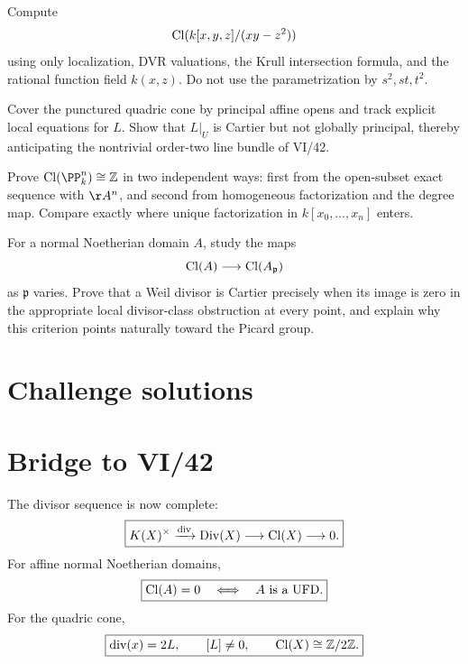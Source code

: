 \begin{problem}\label{chal:vi41-02}
Compute
\[
 \operatorname{Cl}(k[x,y,z]/(xy-z^2))
\]
using only localization, DVR valuations, the Krull intersection formula, and the rational function field \(k(x,z)\). Do not use the parametrization by \(s^2,st,t^2\).
\end{problem}

\begin{problem}\label{chal:vi41-03}
Cover the punctured quadric cone by principal affine opens and track explicit local equations for \(L\). Show that \(L|_U\) is Cartier but not globally principal, thereby anticipating the nontrivial order-two line bundle of VI/42.
\end{problem}

\begin{problem}\label{chal:vi41-04}
Prove \(\Cl(\PP^n_k)\cong\mathbb Z\) in two independent ways: first from the open-subset exact sequence with \(\AA^n\), and second from homogeneous factorization and the degree map. Compare exactly where unique factorization in \(k[x_0,\ldots,x_n]\) enters.
\end{problem}

\begin{problem}\label{chal:vi41-05}
For a normal Noetherian domain \(A\), study the maps
\[
 \operatorname{Cl}(A)\longrightarrow\operatorname{Cl}(A_{\mathfrak p})
\]
as \(\mathfrak p\) varies. Prove that a Weil divisor is Cartier precisely when its image is zero in the appropriate local divisor-class obstruction at every point, and explain why this criterion points naturally toward the Picard group.
\end{problem}

\ifdefined\IncludeChallengeSolutions
\section{Challenge solutions}

\fi

\section*{Bridge to VI/42}

The divisor sequence is now complete:
\[
\boxed{
K(X)^\times
\xrightarrow{\operatorname{div}}
\operatorname{Div}(X)
\longrightarrow
\operatorname{Cl}(X)
\longrightarrow0.
}
\]
For affine normal Noetherian domains,
\[
\boxed{
\operatorname{Cl}(A)=0
\quad\Longleftrightarrow\quad
A\text{ is a UFD}.
}
\]
For the quadric cone,
\[
\boxed{
\operatorname{div}(x)=2L,
\qquad
[L]\neq0,
\qquad
\operatorname{Cl}(X)\cong\mathbb Z/2\mathbb Z.
}
\]

